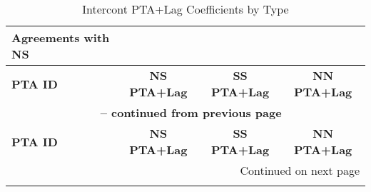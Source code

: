 \begin{longtable}{lccc}
    \caption{Intercont PTA+Lag Coefficients by Type} \label{tab:intercontinental_pta} \\

    \hline
    \textbf{Agreements with NS} &  &  &  \\
    \hline
    \textbf{PTA ID} & \textbf{NS PTA+Lag} & \textbf{SS PTA+Lag} & \textbf{NN PTA+Lag} \\
    \hline
    \endfirsthead
    
    \multicolumn{4}{c}{{\bfseries \tablename\ \thetable{} -- continued from previous page}} \\
    \hline
    \textbf{PTA ID} & \textbf{NS PTA+Lag} & \textbf{SS PTA+Lag} & \textbf{NN PTA+Lag} \\
    \hline
    \endhead
    
    \hline \multicolumn{4}{r}{{Continued on next page}} \\ \hline
    \endfoot
    
    \hline
    \endlastfoot
    

\end{longtable}

